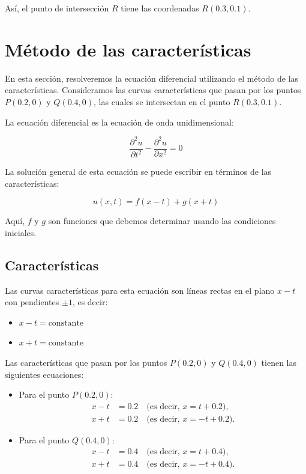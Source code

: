 Así, el punto de intersección $R$ tiene las coordenadas $R(0.3, 0.1)$.


\section{Método de las características}

En esta sección, resolveremos la ecuación diferencial utilizando el método de las características. Consideramos las curvas características que pasan por los puntos \( P(0.2, 0) \) y \( Q(0.4, 0) \), las cuales se intersectan en el punto \( R(0.3, 0.1) \).

La ecuación diferencial es la ecuación de onda unidimensional:

\begin{equation}
\frac{\partial^2 u}{\partial t^2} - \frac{\partial^2 u}{\partial x^2} = 0
\end{equation}

La solución general de esta ecuación se puede escribir en términos de las características:

\begin{equation}
u(x,t) = f(x - t) + g(x + t)
\end{equation}

Aquí, \( f \) y \( g \) son funciones que debemos determinar usando las condiciones iniciales.

\subsection{Características}

Las curvas características para esta ecuación son líneas rectas en el plano \(x-t\) con pendientes \( \pm 1 \), es decir:

\begin{itemize}
    \item \( x - t = \text{constante} \)
    \item \( x + t = \text{constante} \)
\end{itemize}

Las características que pasan por los puntos \( P(0.2, 0) \) y \( Q(0.4, 0) \) tienen las siguientes ecuaciones:

\begin{itemize}
    \item Para el punto \(P(0.2, 0)\):
    \begin{align}
    x - t &= 0.2 \quad \text{(es decir, \(x = t + 0.2\))}, \\
    x + t &= 0.2 \quad \text{(es decir, \(x = -t + 0.2\))}.
    \end{align}

    \item Para el punto \(Q(0.4, 0)\):
    \begin{align}
    x - t &= 0.4 \quad \text{(es decir, \(x = t + 0.4\))}, \\
    x + t &= 0.4 \quad \text{(es decir, \(x = -t + 0.4\))}.
    \end{align}
\end{itemize}


